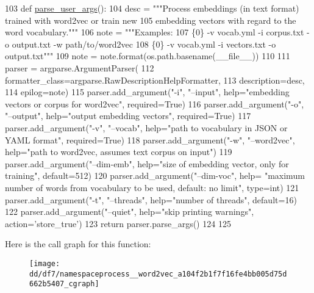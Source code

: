 \begin{DoxyCode}
103 \textcolor{keyword}{def }\hyperlink{namespaceprocess__word2vec_a104f2b1f7f16fe4bb005d75d662b5407}{parse\_user\_args}():
104     desc = \textcolor{stringliteral}{"""Process embeddings (in text format) trained with word2vec or train new}
105 \textcolor{stringliteral}{embedding vectors with regard to the word vocabulary."""}
106     note = \textcolor{stringliteral}{"""Examples:}
107 \textcolor{stringliteral}{  \{0\} -v vocab.yml -i corpus.txt -o output.txt -w path/to/word2vec}
108 \textcolor{stringliteral}{  \{0\} -v vocab.yml -i vectors.txt -o output.txt"""}
109     note = note.format(os.path.basename(\_\_file\_\_))
110 
111     parser = argparse.ArgumentParser(
112         formatter\_class=argparse.RawDescriptionHelpFormatter,
113         description=desc,
114         epilog=note)
115     parser.add\_argument(\textcolor{stringliteral}{"-i"}, \textcolor{stringliteral}{"--input"}, help=\textcolor{stringliteral}{"embedding vectors or corpus for word2vec"}, required=\textcolor{keyword}{True})
116     parser.add\_argument(\textcolor{stringliteral}{"-o"}, \textcolor{stringliteral}{"--output"}, help=\textcolor{stringliteral}{"output embedding vectors"}, required=\textcolor{keyword}{True})
117     parser.add\_argument(\textcolor{stringliteral}{"-v"}, \textcolor{stringliteral}{"--vocab"}, help=\textcolor{stringliteral}{"path to vocabulary in JSON or YAML format"}, required=\textcolor{keyword}{True})
118     parser.add\_argument(\textcolor{stringliteral}{"-w"}, \textcolor{stringliteral}{"--word2vec"}, help=\textcolor{stringliteral}{"path to word2vec, assumes text corpus on input"})
119     parser.add\_argument(\textcolor{stringliteral}{"--dim-emb"}, help=\textcolor{stringliteral}{"size of embedding vector, only for training"}, default=512)
120     parser.add\_argument(\textcolor{stringliteral}{"--dim-voc"}, help= \textcolor{stringliteral}{"maximum number of words from vocabulary to be used, default: no
       limit"}, type=int)
121     parser.add\_argument(\textcolor{stringliteral}{"-t"}, \textcolor{stringliteral}{"--threads"}, help=\textcolor{stringliteral}{"number of threads"}, default=16)
122     parser.add\_argument(\textcolor{stringliteral}{"--quiet"}, help=\textcolor{stringliteral}{"skip printing warnings"}, action=\textcolor{stringliteral}{'store\_true'})
123     \textcolor{keywordflow}{return} parser.parse\_args()
124 
125 
\end{DoxyCode}


Here is the call graph for this function\+:
\nopagebreak
\begin{figure}[H]
\begin{center}
\leavevmode
\texttt{[image: dd/df7/namespaceprocess\_\_word2vec\_a104f2b1f7f16fe4bb005d75d662b5407\_cgraph]}
\end{center}
\end{figure}




